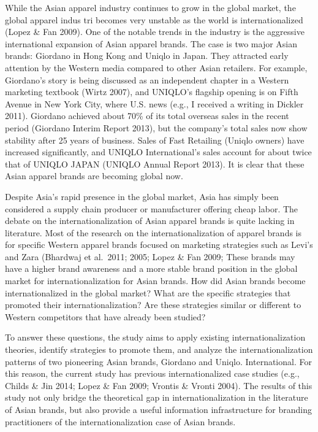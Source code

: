\documentclass[12pt,]{article}
\begin{document}
While the Asian apparel industry continues to grow in the global market,
the global apparel indus tri becomes very unstable as the world is
internationalized (Lopez \& Fan 2009). One of the notable trends in the
industry is the aggressive international expansion of Asian apparel
brands. The case is two major Asian brands: Giordano in Hong Kong and
Uniqlo in Japan. They attracted early attention by the Western media
compared to other Asian retailers. For example, Giordano's story is
being discussed as an independent chapter in a Western marketing
textbook (Wirtz 2007), and UNIQLO's flagship opening is on Fifth Avenue
in New York City, where U.S. news (e.g., I received a writing in Dickler
2011). Giordano achieved about 70\% of its total overseas sales in the
recent period (Giordano Interim Report 2013), but the company's total
sales now show stability after 25 years of business. Sales of Fast
Retailing (Uniqlo owners) have increased significantly, and UNIQLO
International's sales account for about twice that of UNIQLO JAPAN
(UNIQLO Annual Report 2013). It is clear that these Asian apparel brands
are becoming global now.

Despite Asia's rapid presence in the global market, Asia has simply been
considered a supply chain producer or manufacturer offering cheap labor.
The debate on the internationalization of Asian apparel brands is quite
lacking in literature. Most of the research on the internationalization
of apparel brands is for specific Western apparel brands focused on
marketing strategies such as Levi's and Zara (Bhardwaj et al.~2011;
2005; Lopez \& Fan 2009; These brands may have a higher brand awareness
and a more stable brand position in the global market for
internationalization for Asian brands. How did Asian brands become
internationalized in the global market? What are the specific strategies
that promoted their internationalization? Are these strategies similar
or different to Western competitors that have already been studied?

To answer these questions, the study aims to apply existing
internationalization theories, identify strategies to promote them, and
analyze the internationalization patterns of two pioneering Asian
brands, Giordano and Uniqlo. International. For this reason, the current
study has previous internationalized case studies (e.g., Childs \& Jin
2014; Lopez \& Fan 2009; Vrontis \& Vronti 2004). The results of this
study not only bridge the theoretical gap in internationalization in the
literature of Asian brands, but also provide a useful information
infrastructure for branding practitioners of the internationalization
case of Asian brands.
\end{document}

